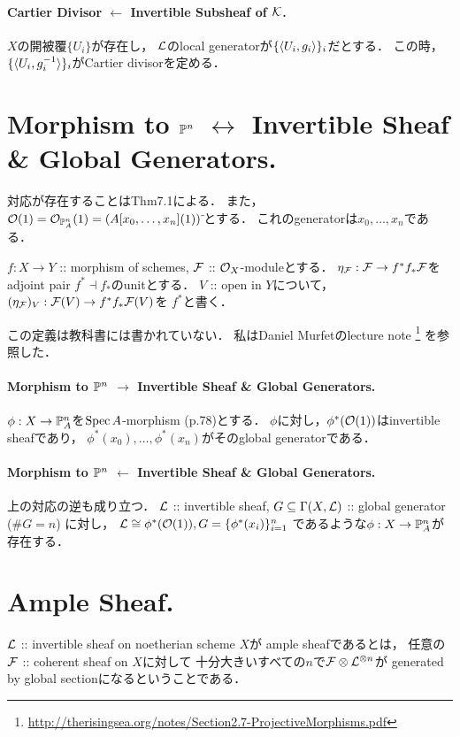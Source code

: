\documentclass[a4paper]{jsarticle}
\begin{document}
\paragraph{Cartier Divisor $\leftarrow$ Invertible Subsheaf of $\mathcal{K}$.}
    $X$の開被覆$\{U_i\}$が存在し，
    $\mathcal{L}$のlocal generatorが$\{\langle U_i,g_i \rangle\}_i$だとする．
    この時，$\{\langle U_i,g_i^{-1} \rangle\}_i$がCartier divisorを定める．

\section{Morphism to $\mathbb{P}^n$ $\leftrightarrow$ Invertible Sheaf \& Global Generators.}
    対応が存在することはThm7.1による．
    また，$\mathcal{O}(1)=\mathcal{O}_{\mathbb{P}_A^n}(1)=(A[x_0,\dots,x_n](1))\,\tilde{}$とする．
    これのgeneratorは$x_0,\dots,x_n$である．

    \begin{Def}
        $f: X \to Y$ :: morphism of schemes,
        $\mathcal{F}$ :: $\mathcal{O}_X$-moduleとする．
        $\eta_{\mathcal{F}}: \mathcal{F} \to f^* f_* \mathcal{F}$をadjoint pair $f^* \dashv f_*$のunitとする．
        $V$ :: open in $Y$について，
        $(\eta_{\mathcal{F}})_V: \mathcal{F}(V) \to f^*f_*\mathcal{F}(V)$を
        $f^*$と書く．
    \end{Def}
    この定義は教科書には書かれていない．
    私はDaniel Murfetのlecture note
    \footnote{ \url{http://therisingsea.org/notes/Section2.7-ProjectiveMorphisms.pdf} }
    を参照した．

    \paragraph{Morphism to $\mathbb{P}^n$ $\rightarrow$ Invertible Sheaf \& Global Generators.}
    $\phi: X \to \mathbb{P}_A^n$を$\operatorname{Spec} A$-morphism (p.78)とする．
    $\phi$に対し，$\phi^*(\mathcal{O}(1))$はinvertible sheafであり，
    $\phi^*(x_0), \dots, \phi^*(x_n)$がそのglobal generatorである．

    \paragraph{Morphism to $\mathbb{P}^n$ $\leftarrow$ Invertible Sheaf \& Global Generators.}
    上の対応の逆も成り立つ．
    $\mathcal{L}$ :: invertible sheaf,
    $G \subseteq \Gamma(X, \mathcal{L})$ :: global generator ($\#G=n$)
    に対し，
    $\mathcal{L} \cong \phi^*(\mathcal{O}(1)), G=\{\phi^*(x_i)\}_{i=1}^n$
    であるような$\phi: X \to \mathbb{P}_A^n$が存在する．

\section{Ample Sheaf.}
    \begin{Def}
        $\mathcal{L}$ :: invertible sheaf on noetherian scheme $X$が
        ample sheafであるとは，
        任意の$\mathcal{F}$ :: coherent sheaf on $X$に対して
        十分大きいすべての$n$で$\mathcal{F} \otimes \mathcal{L}^{\otimes n}$が
        generated by global sectionになるということである．
    \end{Def}
\end{document}
